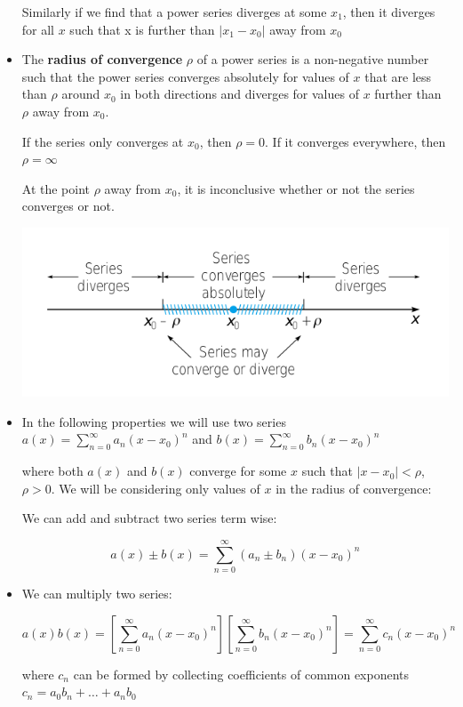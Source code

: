 \documentclass{report}
\begin{document}
\begin{itemize}
    Similarly if we find that a power series diverges at some $x_1$, then it diverges for all $x$ such that x is further than $|x_1-x_0|$ away from $x_0$
    
    
    \item The \textbf{radius of convergence} $\rho$ of a power series is a non-negative number such that the power series converges absolutely for values of $x$ that are less than $\rho$ around $x_0$ in both directions and diverges for values of $x$ further than $\rho$ away from $x_0$.
    
    If the series only converges at $x_0$, then $\rho = 0$. If it converges everywhere, then $\rho = \infty$
    
    At the point $\rho$ away from $x_0$, it is inconclusive whether or not the series converges or not.
    
    \includegraphics[scale=0.5]{convergence.png}
    
    \item In the following properties we will use two series $a(x) = \sum_{n=0}^{\infty}a_n(x-x_0)^n$ and $b(x) = \sum_{n=0}^{\infty}b_n(x-x_0)^n$
    
    where both $a(x)$ and $b(x)$ converge for some $x$ such that $|x-x_0| < \rho$, $\rho > 0$. We will be considering only values of $x$ in the radius of convergence:
    
    We can add and subtract two series term wise:
    
    $$a(x) \pm b(x) = \sum_{n=0}^{\infty}(a_n \pm b_n)(x-x_0)^n  $$
    
    \item We can multiply two series:
    
    $$
    a(x)b(x)
    = \left[\sum_{n=0}^{\infty}a_n(x-x_0)^n \right] \left[\sum_{n=0}^{\infty}b_n(x-x_0)^n \right]
    = \sum_{n=0}^{\infty}c_n(x-x_0)^n
    $$
    
    where $c_n$ can be formed by collecting coefficients of common exponents $c_n = a_0b_n + \dots + a_nb_0$
    

\end{itemize}
\end{document}
